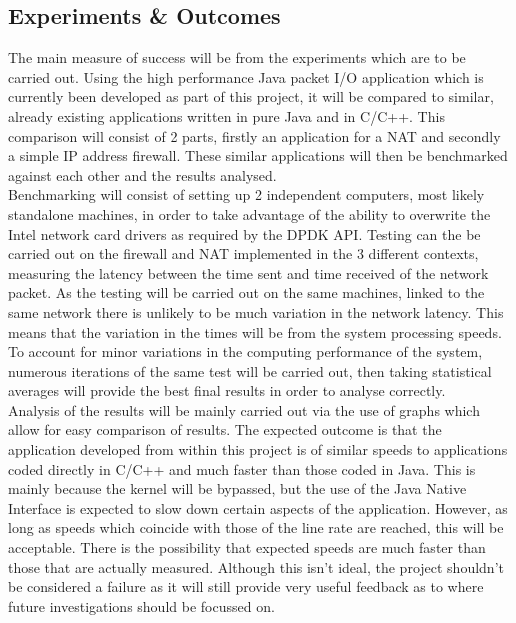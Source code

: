 \documentclass[a4paper, titlepage]{article}
\begin{document}
\subsection{Experiments \& Outcomes}
The main measure of success will be from the experiments which are to be carried out. Using the high performance Java packet I/O application which is currently been developed as part of this project, it will be compared to similar, already existing applications written in pure Java and in C/C++. This comparison will consist of 2 parts, firstly an application for a NAT and secondly a simple IP address firewall. These similar applications will then be benchmarked against each other and the results analysed. \\
\newline
Benchmarking will consist of setting up 2 independent computers, most likely standalone machines, in order to take advantage of the ability to overwrite the Intel network card drivers as required by the DPDK API. Testing can the be carried out on the firewall and NAT implemented in the 3 different contexts, measuring the latency between the time sent and time received of the network packet. As the testing will be carried out on the same machines, linked to the same network there is unlikely to be much variation in the network latency. This means that the variation in the times will be from the system processing speeds. To account for minor variations in the computing performance of the system, numerous iterations of the same test will be carried out, then taking statistical averages will provide the best final results in order to analyse correctly. \\
\newline
Analysis of the results will be mainly carried out via the use of graphs which allow for easy comparison of results. The expected outcome is that the application developed from within this project is of similar speeds to applications coded directly in C/C++ and much faster than those coded in Java. This is mainly because the kernel will be bypassed, but the use of the Java Native Interface is expected to slow down certain aspects of the application. However, as long as speeds which coincide with those of the line rate are reached, this will be acceptable. There is the possibility that expected speeds are much faster than those that are actually measured. Although this isn't ideal, the project shouldn't be considered a failure as it will still provide very useful feedback as to where future investigations should be focussed on.
\end{document}
